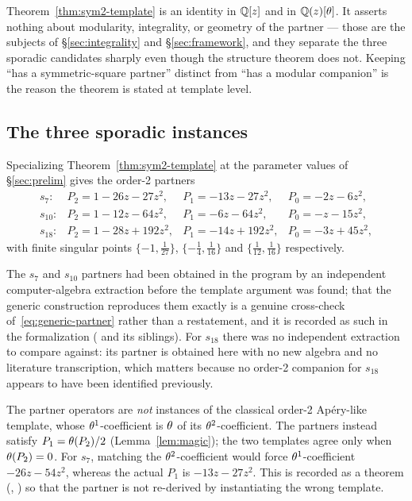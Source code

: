 \begin{remark}
Theorem~\ref{thm:sym2-template} is an identity in $\mathbb{Q}[z]$ and in
$\mathbb{Q}(z)[\theta]$. It asserts nothing about modularity, integrality, or
geometry of the partner --- those are the subjects of
\S\ref{sec:integrality} and \S\ref{sec:framework}, and they separate the
three sporadic candidates sharply even though the structure theorem does not.
Keeping ``has a symmetric-square partner'' distinct from ``has a modular
companion'' is the reason the theorem is stated at template level.
\end{remark}

\subsection{The three sporadic instances}

\begin{corollary}[status (K)]\label{cor:sporadic-partners}
Specializing Theorem~\ref{thm:sym2-template} at the parameter values of
\S\ref{sec:prelim} gives the order-2 partners
\[
\begin{array}{llll}
  s_7: & P_2 = 1-26z-27z^2, & P_1 = -13z-27z^2, & P_0 = -2z-6z^2,\\[2pt]
  s_{10}: & P_2 = 1-12z-64z^2, & P_1 = -6z-64z^2, & P_0 = -z-15z^2,\\[2pt]
  s_{18}: & P_2 = 1-28z+192z^2, & P_1 = -14z+192z^2, & P_0 = -3z+45z^2,
\end{array}
\]
with finite singular points $\{-1,\tfrac1{27}\}$, $\{-\tfrac14,\tfrac1{16}\}$
and $\{\tfrac1{12},\tfrac1{16}\}$ respectively.
\end{corollary}

The $s_7$ and $s_{10}$ partners had been obtained in the program by an
independent computer-algebra extraction before the template argument was
found; that the generic construction reproduces them exactly is a genuine
cross-check of~\eqref{eq:generic-partner} rather than a restatement, and it is
recorded as such in the formalization ( and its
siblings). For $s_{18}$ there was no independent extraction to compare
against: its partner is obtained here with no new algebra and no literature
transcription, which matters because no order-2 companion for $s_{18}$ appears
to have been identified previously.

\begin{remark}
The partner operators are \emph{not} instances of the classical order-2
Ap\'ery-like template, whose $\theta^1$-coefficient is $\theta$ of its
$\theta^2$-coefficient. The partners instead satisfy $P_1 = \theta(P_2)/2$
(Lemma~\ref{lem:magic}); the two templates agree only when $\theta(P_2)=0$.
For $s_7$, matching the $\theta^2$-coefficient would force
$\theta^1$-coefficient $-26z-54z^2$, whereas the actual $P_1$ is
$-13z-27z^2$. This is recorded as a theorem
(, ) so that
the partner is not re-derived by instantiating the wrong template.
\end{remark}

